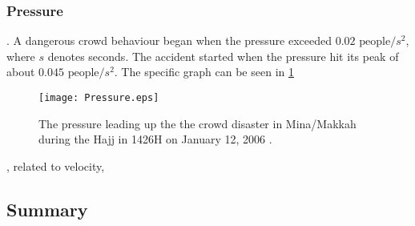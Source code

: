 
\subsubsection{Pressure}
. A dangerous crowd behaviour began when the pressure exceeded $0.02 \text{ people} / s^2$, where $s$ denotes seconds. The accident started when the pressure hit its peak of about $0.045 \text{ people} / s^2$. The specific graph can be seen in \cref{mekkahCrowdDistaster206}

\begin{figure}
    \centering
    \texttt{[image: Pressure.eps]}
    \caption{The pressure leading up the the crowd disaster in Mina/Makkah during the Hajj in 1426H on January 12, 2006 \cite{empircalstudy}.}
    \label{mekkahCrowdDistaster206}
\end{figure}


, related to velocity,\subsection{Summary}\label{sec:crowd_conditions_summary}

